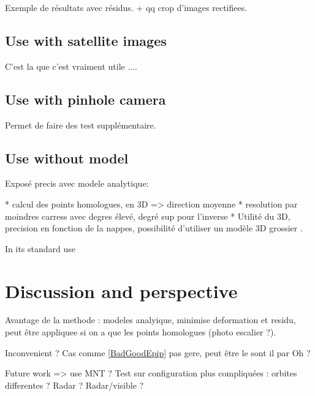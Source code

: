 \documentclass[a4paper]{article}
\begin{document}
Exemple de résultats avec résidus. + qq crop d'images rectifiees.

\subsection{Use with satellite images}

C'est la que c'est vraiment utile .... 


\subsection{Use with pinhole camera}

Permet de faire des test supplémentaire.

\subsection{Use without model}


Exposé precis avec modele analytique:

    * calcul des points homologues, en 3D => direction moyenne
    * resolution par moindres carress avec degres élevé, degré sup pour l'inverse
    * Utilité du 3D, precision en fonction de la nappes, possibilité d'utiliser un modèle 3D grossier .

In its standard use
    

\section{Discussion and perspective}

Avantage de la methode : modeles analyique, minimise deformation et residu, peut être appliquee 
si on a que les points homologues (photo escalier ?).

Inconvenient ? Cas comme \ref{BadGoodEpip} pas gere, peut être le sont il par Oh ?

Future work => use MNT ? Test sur configuration plus compliquées : orbites differentes ? Radar ? Radar/visible ?






\end{document}
